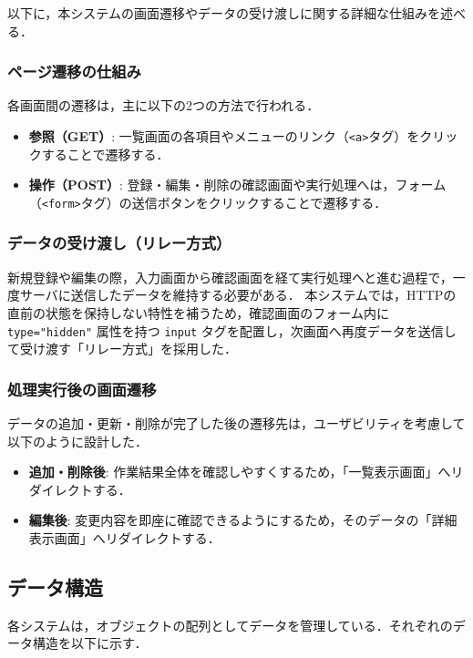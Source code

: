以下に，本システムの画面遷移やデータの受け渡しに関する詳細な仕組みを述べる．

\subsubsection{ページ遷移の仕組み}
各画面間の遷移は，主に以下の2つの方法で行われる．
\begin{itemize}
    \item \textbf{参照（GET）}: 一覧画面の各項目やメニューのリンク（\texttt{<a>}タグ）をクリックすることで遷移する．
    \item \textbf{操作（POST）}: 登録・編集・削除の確認画面や実行処理へは，フォーム（\texttt{<form>}タグ）の送信ボタンをクリックすることで遷移する．
\end{itemize}

\subsubsection{データの受け渡し（リレー方式）}
新規登録や編集の際，入力画面から確認画面を経て実行処理へと進む過程で，一度サーバに送信したデータを維持する必要がある．
本システムでは，HTTPの直前の状態を保持しない特性を補うため，確認画面のフォーム内に \texttt{type="hidden"} 属性を持つ \texttt{input} タグを配置し，次画面へ再度データを送信して受け渡す「リレー方式」を採用した．

\subsubsection{処理実行後の画面遷移}
データの追加・更新・削除が完了した後の遷移先は，ユーザビリティを考慮して以下のように設計した．
\begin{itemize}
    \item \textbf{追加・削除後}: 作業結果全体を確認しやすくするため，「一覧表示画面」へリダイレクトする．
    \item \textbf{編集後}: 変更内容を即座に確認できるようにするため，そのデータの「詳細表示画面」へリダイレクトする．
\end{itemize}

\clearpage
\subsection{データ構造}
各システムは，オブジェクトの配列としてデータを管理している．それぞれのデータ構造を以下に示す．

